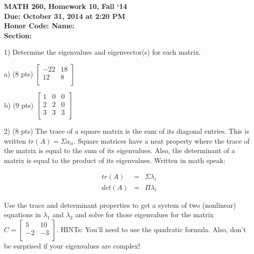 \documentclass{article}
\begin{document}
\begin{flushleft}
	\bfseries{MATH 260, Homework 10, Fall `14}\\
	\bfseries{Due: October 31, 2014 at 2:20 PM}\\
	\bfseries{Honor Code:} \hspace{3.5in}\bfseries{Name:}\\
	\hspace{4.37in}\bfseries{Section:}
\end{flushleft}
\begin{flushleft}
\vspace{.25in}

1) Determine the eigenvalues and eigenvector(s) for each matrix.

\vspace{0.2in}

a) (8 pts) $\begin{bmatrix} -22&18\\12&8\\ \end{bmatrix}$

\pagebreak

b) (9 pts) $\begin{bmatrix} 1&0&0\\2&2&0\\3&3&3\\ \end{bmatrix}$

\pagebreak

2) (8 pts) The trace of a square matrix is the sum of its diagonal entries.  This is written $tr(A) = \Sigma a_{ii}$.  Square matrices have a neat property where the trace of the matrix is equal to the sum of its eigenvalues.  Also, the determinant of a matrix is equal to the product of its eigenvalues.  Written in math speak:

\begin{eqnarray*}
tr(A) &=& \Sigma \lambda_i\\
det(A) &=& \Pi \lambda_i
\end{eqnarray*}

Use the trace and determinant properties to get a system of two (nonlinear) equations in $\lambda_1$ and $\lambda_2$ and solve for those eigenvalues for the matrix $C = \begin{bmatrix} 5&10\\-2&-3\\ \end{bmatrix}$.  HINTs:  You'll need to use the quadratic formula.  Also, don't be surprised if your eigenvalues are complex!

\end{flushleft}
\end{document}
